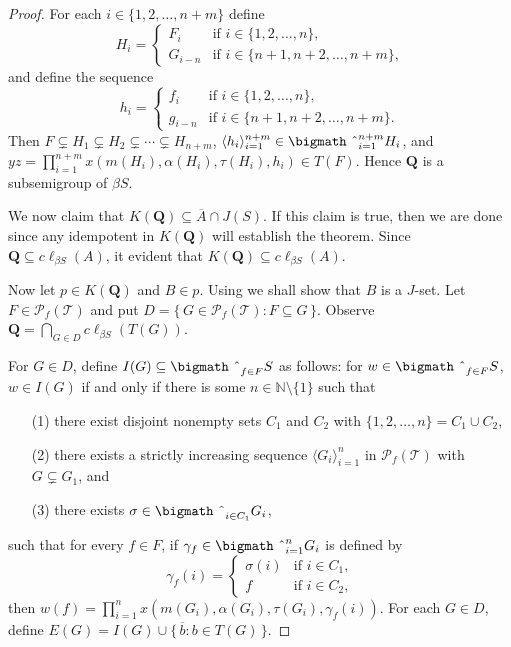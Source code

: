 \documentclass[12pt,showtrims]{memoir}
\theoremstyle{plain}
\theoremstyle{definition}
\newcommand{\la}{\langle}
\newcommand{\ra}{\rangle}
\newcommand{\bbN}{\mathbb{N}}
\newcommand{\calT}{\mathcal{T}}
\newcommand{\Pf}{\mathcal{P}_f}
\newcommand{\bigtimes}{\hbox{\bigmath \char'2}}
\begin{document}
\begin{proof}
  For each $i \in \{1, 2, \ldots, n+m\}$ define 
  \[
    H_i = 
    \begin{cases}
      F_i & \mbox{if $i \in \{1, 2, \ldots, n\}$,} \\
      G_{i-n} & \mbox{if $i \in \{n+1, n+2, \ldots, n+m\}$,}
    \end{cases}
  \]
  and define the sequence
  \[
    h_i =
    \begin{cases}
      f_i & \mbox{if $i \in \{1, 2, \ldots, n\}$,} \\
      g_{i-n} & \mbox{if $i \in \{n+1, n+2, \ldots, n+m\}$.}
    \end{cases}
  \]
  Then $F \subsetneq H_1 \subsetneq H_2 \subsetneq \cdots \subsetneq H_{n+m}$, $\la h_i \ra_{i=1}^{n+m} \in \bigtimes_{i=1}^{n+m} H_i$, and $yz = \prod_{i=1}^{n+m} x(m(H_i), \alpha(H_i), \tau(H_i), h_i) \in T(F)$. 
  Hence $\mathbf{Q}$ is a subsemigroup of $\beta S$. 

  We now claim that $K(\mathbf{Q}) \subseteq \overline{A} \cap J(S)$. 
  If this claim is true, then we are done since any idempotent in $K(\mathbf{Q})$ will establish the theorem. 
  Since $\mathbf{Q} \subseteq c\ell_{\beta S} (A)$, it evident that $K(\mathbf{Q}) \subseteq c\ell_{\beta S} (A)$. 

  Now let $p \in K(\mathbf{Q})$ and $B \in p$.
  Using \cite[Lemma 14.9]{Hindman:1998fk} we shall show that $B$ is a $J$-set. 
  Let $F \in \Pf(\calT)$ and put $D = \{\, G \in \Pf(\calT) : F \subseteq G \,\}$. 
  Observe $\mathbf{Q} = \bigcap_{G \in D} c\ell_{\beta S} (T(G))$.

  For $G \in D$, define $I(G) \subseteq \bigtimes_{f \in F} S$ as follows: for $w \in \bigtimes_{f \in F} S$, $w \in I(G)$ if and only if there is some $n \in \bbN \setminus \{1\}$ such that 
  \begin{itemize}
    \item[(1)]
      there exist disjoint nonempty sets $C_1$ and $C_2$ with $\{1, 2, \ldots, n\} = C_1 \cup C_2$, 
      
    \item[(2)]
      there exists a strictly increasing sequence $\la G_i \ra_{i=1}^n$ in $\Pf(\calT)$ with $G \subsetneq G_1$, and

    \item[(3)]
      there exists $\sigma \in \bigtimes_{i \in C_1} G_i$, 
  \end{itemize}
such that for every $f \in F$, if $\gamma_f \in \bigtimes_{i=1}^n G_i$ is defined by 
  \[
    \gamma_f(i) = 
    \begin{cases}
      \sigma(i) & \mbox{if $i \in C_1$,} \\
      f & \mbox{if $i \in C_2$,} 
    \end{cases}
  \]
then $w(f) = \prod_{i=1}^n x(m(G_i), \alpha(G_i), \tau(G_i), \gamma_f(i))$.
  For each $G \in D$, define $E(G) = I(G) \cup \{\, \overline{b} : b \in T(G) \,\}$. 


\end{proof}
\end{document}
